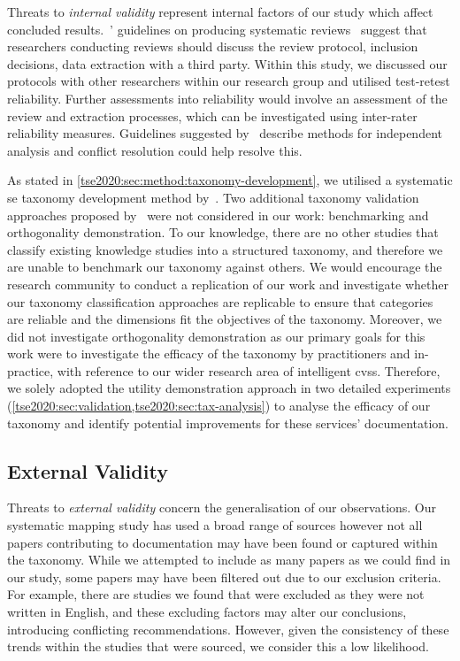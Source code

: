 Threats to \textit{internal validity} represent internal factors of our study which affect concluded results.~\citeauthor{Kitchenham:2007dd}' guidelines on producing systematic reviews~\citep{Kitchenham:2007dd} suggest that researchers conducting reviews should discuss the review protocol, inclusion decisions, data extraction with a third party. Within this study, we discussed our protocols with other researchers within our research group and utilised test-retest reliability. Further assessments into reliability would involve an assessment of the review and extraction processes, which can be investigated using inter-rater reliability measures. Guidelines suggested by~\citet{Garousi:2017:EGE:3084226.3084238} describe methods for independent analysis and conflict resolution could help resolve this.

As stated in \cref{tse2020:sec:method:taxonomy-development}, we utilised a systematic \gls{se} taxonomy development method by~\citet{Usman:2017hn}. Two additional taxonomy validation approaches proposed by~\citeauthor{Usman:2017hn} were not considered in our work: benchmarking and orthogonality demonstration. To our knowledge, there are no other studies that classify existing  knowledge studies into a structured taxonomy, and therefore we are unable to benchmark our taxonomy against others. We would encourage the research community to conduct a replication of our work and investigate whether our taxonomy classification approaches are replicable to ensure that categories are reliable and the dimensions fit the objectives of the taxonomy. Moreover, we did not investigate orthogonality demonstration as our primary goals for this work were to investigate the efficacy of the taxonomy by practitioners and in-practice, with reference to our wider research area of intelligent \glspl{cvs}. Therefore, we solely adopted the utility demonstration approach in two detailed experiments (\cref{tse2020:sec:validation,tse2020:sec:tax-analysis}) to analyse the efficacy of our taxonomy and identify potential improvements for these services'  documentation.



\subsection{External Validity}

Threats to \textit{external validity} concern the generalisation of our observations. Our systematic mapping study has used a broad range of sources however not all papers contributing to  documentation may have been found or captured within the taxonomy. While we attempted to include as many papers as we could find in our study, some papers may have been filtered out due to our exclusion criteria. For example, there are studies we found that were excluded as they were not written in English, and these excluding factors may alter our conclusions, introducing conflicting recommendations. However, given the consistency of these trends within the studies that were sourced, we consider this a low likelihood.

